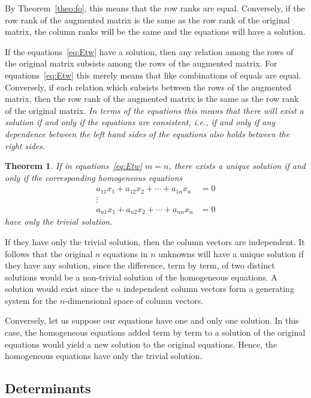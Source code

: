 \documentclass[10pt,leqno]{article}
\newtheorem{theo}{Theorem}
\theoremstyle{definition}
\begin{document}
By Theorem~\ref{theo:fo}, this means that the row ranks are equal.
Conversely, if the row rank of the augmented matrix is the same as the row rank of the original matrix, the column ranks will be the same and the equations will have a solution.

If the equations~\eqref{eq:Etw} have a solution, then any relation among the rows of the original matrix subsists among the rows of the augmented matrix.
For equations~\eqref{eq:Etw} this merely means that like combinations of equals are equal.
Conversely, if each relation which subsists between the rows of the augmented matrix, then the row rank of the augmented matrix is the same as the row rank of the original matrix.
\emph{In terms of the equations this means that there will exist a solution if and only if the equations are consistent, i.e., if and only if any dependence between the left hand sides of the equations also holds between the right sides.}


\begin{theo}
\label{theo:fi}
If in equations~\eqref{eq:Etw} $m = n$, there exists a unique solution if and only if the corresponding homogeneous equations
\begin{align*}
a_{11}x_1 + a_{12}x_2 + \cdots + a_{1n}x_n &= 0
\\
\vdots &
\\
a_{n1}x_1 + a_{n2}x_2 + \cdots + a_{nn}x_n &= 0
\end{align*}
have only the trivial solution.
\end{theo}


If they have only the trivial solution, then the column vectors are independent.
It follows that the original $n$ equations in $n$ unknowns will have a unique solution if they have any solution, since the difference, term by term, of two distinct solutions would be a non-trivial solution of the homogeneous equations.
A solution would exist since the $n$ independent column vectors form a generating system for the $n$-dimensional space of column vectors.

Conversely, let us suppose our equations have one and only one solution.
In this case, the homogeneous equations added term by term to a solution of the original equations would yield a new solution to the original equations.
Hence, the homogeneous equations have only the trivial solution.


\subsection{Determinants}
\end{document}
